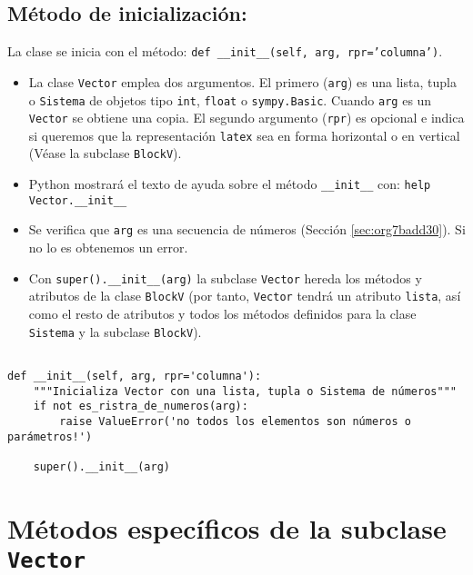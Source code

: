 \documentclass[11pt]{report}
\begin{document}
\subsection{Método de inicialización:}
\label{sec:org6fa7ceb}

La clase se inicia con el método: \texttt{def \_\_init\_\_(self, arg, rpr='columna')}.

\begin{itemize}
\item La clase \texttt{Vector} emplea dos argumentos. El primero (\texttt{arg}) es una
lista, tupla o \texttt{Sistema} de objetos tipo \texttt{int}, \texttt{float} o
\texttt{sympy.Basic}. Cuando \texttt{arg} es un \texttt{Vector} se obtiene una copia. El
segundo argumento (\texttt{rpr}) es opcional e indica si queremos que la
representación \texttt{latex} sea en forma horizontal o en vertical (Véase
la subclase \texttt{BlockV}).

\item Python mostrará el texto de ayuda sobre el método \texttt{\_\_init\_\_} con:
\texttt{help Vector.\_\_init\_\_}

\item Se verifica que \texttt{arg} es una secuencia de números (Sección
\ref{sec:org7badd30}). Si no lo es obtenemos un error.

\item Con \texttt{super().\_\_init\_\_(arg)} la subclase \texttt{Vector} hereda los métodos
y atributos de la clase \texttt{BlockV} (por tanto, \texttt{Vector} tendrá un
atributo \texttt{lista}, así como el resto de atributos y todos los métodos
definidos para la clase \texttt{Sistema} y la subclase \texttt{BlockV}).
\end{itemize}


\begin{verbatim}

def __init__(self, arg, rpr='columna'):
    """Inicializa Vector con una lista, tupla o Sistema de números"""                       
    if not es_ristra_de_numeros(arg):
        raise ValueError('no todos los elementos son números o parámetros!')
    
    super().__init__(arg)

\end{verbatim}

\section{Métodos específicos de la subclase \texttt{Vector}}
\label{sec:org96aea3d}
\end{document}
